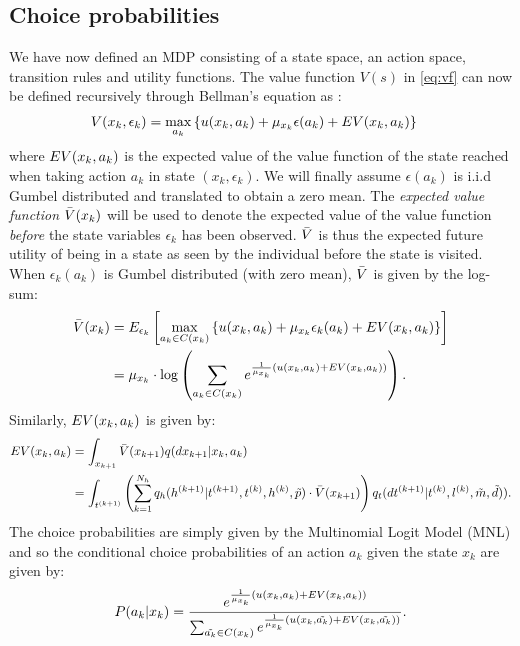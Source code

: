 


\subsection{Choice probabilities}
We have now defined an MDP consisting of a state space, an action space, transition rules and utility functions. 
The value function $V(s)$ in \eqref{eq:vf} can now be defined recursively through Bellman's equation as \citep{bellman,Rust87}:
\begin{equation} \label{eq:vfbellman}
\begin{aligned}
V(x_k,\epsilon_k) &= \max_{a_k} \left\{\avgu(x_k,a_k) + \mu_{x_k}\epsilon(a_k)+ \eutil(x_k,a_k) \right\} 
\end{aligned}
\end{equation}
where $EV(x_k,a_k) $ is the expected value of the value function of the state reached when taking action $a_k$ in state $(x_k,\epsilon_k)$. We will finally assume $\epsilon(a_k)$ is i.i.d Gumbel distributed and translated to obtain a zero mean. 
The \emph{expected value function} $\bar{V}(x_k)$ will be used to denote the expected value of the value function \emph{before} the state variables $\epsilon_k$ has been observed. $\bar{V}$ is thus the expected future utility of being in a state as seen by the individual before the state is visited. When $\epsilon_k(a_k)$ is Gumbel distributed (with zero mean), $\bar{V}$ is given by the log-sum:
\begin{equation} \label{eq:evfbellman}
\begin{aligned}
\ev(x_k) &= E_{\epsilon_k} \left[ \max_{{a_k}\in C(x_{k})} \left\{\avgu(x_k,a_k) + \mu_{x_k} \epsilon_k(a_k)+ \eutil(x_k,a_k) \right\}  \right] \\&= \mu_{x_k}\cdot\log\left(\sum_{a_k\in C(x_{k})} e^{\frac{1}{\mu_{x_k}}\left(\avgu(x_k,a_k) + \eutil(x_k,a_k)\right)}\right).
\end{aligned}
\end{equation}
Similarly, $EV(x_k,a_k)$ is given by:
\begin{equation} \label{eq:vfrust}
\begin{aligned}
    \eutil(x_k,a_k) &= \int_{x_{k+1}} \ev(x_{k+1})q(dx_{k+1}|x_k,a_k) \\
    &= \int_{t\ks{k+1}} \left( \sum_{k=1}^{N_{\amem}}q_\amem(\amem\ks{k+1}|t\ks{k+1}, t\ks{k},\amem\ks{k},\act{p}) \cdot \ev(x_{k+1}) \right)q_t(dt\ks{k+1}|t\ks{k},l\ks{k},\act{m},\act{d})).
\end{aligned}
\end{equation}
The choice probabilities are simply given by the Multinomial Logit Model (MNL) and so the conditional choice probabilities of an action $a_k$ given the state $x_k$ are given by:
\newcommand{\akt}{\tilde{a_k}}
\begin{equation} \label{eq:pcond}
P(a_k|x_k) = \frac{e^{\frac{1}{\mu_{x_k}}\left(\avgu(x_k,a_k) + \eutil(x_k,a_k)\right)}}{\sum_{\akt \in C(x_k)}e^{\frac{1}{\mu_{x_k}}\left(\avgu(x_k,\akt) + \eutil(x_k,\akt)\right)}}.
\end{equation}


